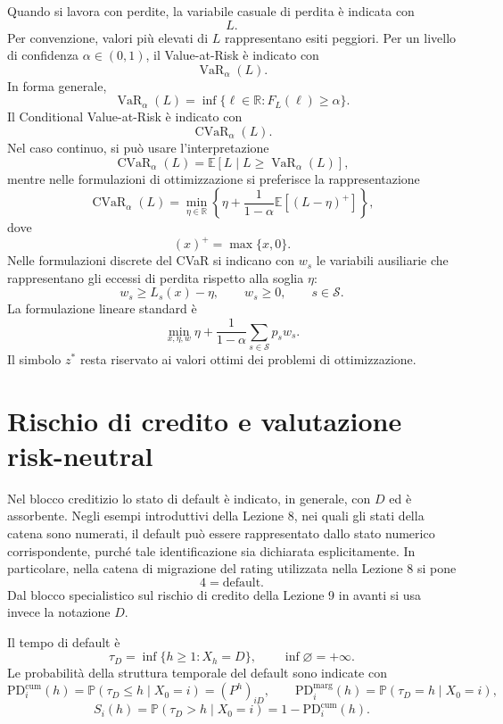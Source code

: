 \documentclass[12pt,a4paper]{article}
\newcommand{\R}{\mathbb{R}}
\newcommand{\E}{\mathbb{E}}
\newcommand{\Prob}{\mathbb{P}}
\newcommand{\1}{\mathbf{1}}
\newcommand{\VaR}{\operatorname{VaR}}
\newcommand{\CVaR}{\operatorname{CVaR}}
\begin{document}
Quando si lavora con perdite, la variabile casuale di perdita \`e indicata con
\[
 L.
\]
Per convenzione, valori pi\`u elevati di $L$ rappresentano esiti peggiori.
Per un livello di confidenza $\alpha\in(0,1)$, il Value-at-Risk \`e indicato
con
\[
 \VaR_{\alpha}(L).
\]
In forma generale,
\[
 \VaR_{\alpha}(L)=\inf\{\ell\in\R:F_L(\ell)\geq \alpha\}.
\]
Il Conditional Value-at-Risk \`e indicato con
\[
 \CVaR_{\alpha}(L).
\]
Nel caso continuo, si pu\`o usare l'interpretazione
\[
 \CVaR_{\alpha}(L)=\E\left[L\mid L\geq \VaR_{\alpha}(L)\right],
\]
mentre nelle formulazioni di ottimizzazione si preferisce la rappresentazione
\[
 \CVaR_{\alpha}(L)=\min_{\eta\in\R}\left\{\eta+\frac{1}{1-\alpha}\E[(L-\eta)^+]\right\},
\]
dove
\[
(x)^+=\max\{x,0\}.
\]
Nelle formulazioni discrete del CVaR si indicano con $w_s$ le variabili
ausiliarie che rappresentano gli eccessi di perdita rispetto alla soglia
$\eta$:
\[
w_s\geq L_s(x)-\eta,
\qquad
w_s\geq0,
\qquad
s\in\mathcal S.
\]
La formulazione lineare standard \`e
\[
\min_{x,\eta,w}
\eta+\frac{1}{1-\alpha}\sum_{s\in\mathcal S}p_s w_s.
\]
Il simbolo $z^*$ resta riservato ai valori ottimi dei problemi di ottimizzazione.

\section{Rischio di credito e valutazione risk-neutral}

Nel blocco creditizio lo stato di default \`e indicato, in generale, con
$D$ ed \`e assorbente. Negli esempi introduttivi della Lezione 8, nei
quali gli stati della catena sono numerati, il default pu\`o essere
rappresentato dallo stato numerico corrispondente, purch\'e tale
identificazione sia dichiarata esplicitamente. In particolare, nella catena
di migrazione del rating utilizzata nella Lezione 8 si pone
\[
4=\text{default}.
\]
Dal blocco specialistico sul rischio di credito della Lezione 9 in avanti si
usa invece la notazione $D$.

Il tempo di default \`e
\[
\tau_D=\inf\{h\geq1:X_h=D\},
\qquad
\inf\varnothing=+\infty.
\]
Le probabilit\`a della struttura temporale del default sono indicate con
\[
\mathrm{PD}_i^{\mathrm{cum}}(h)=\Prob(\tau_D\leq h\mid X_0=i)=(P^h)_{iD},
\qquad
\mathrm{PD}_i^{\mathrm{marg}}(h)=\Prob(\tau_D=h\mid X_0=i),
\]
\[
S_i(h)=\Prob(\tau_D>h\mid X_0=i)=1-\mathrm{PD}_i^{\mathrm{cum}}(h).
\]
\end{document}
